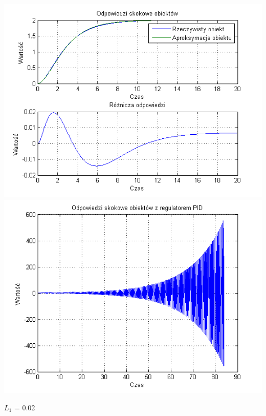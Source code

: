 \documentclass[10pt,a4paper]{article}
\begin{document}
\begin{center}
\includegraphics[scale=1]{images/dwa/skrypt_171.png}\\
\includegraphics[scale=1]{images/dwa/skrypt_172.png}\\
\end{center}
\newpage
$L_1$ = 0.02
\end{document}
